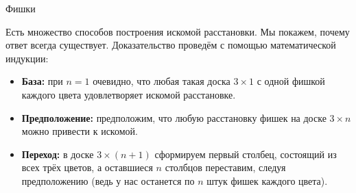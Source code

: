 \begin{tutorial}{Фишки}

Есть множество способов построения искомой расстановки. Мы покажем, почему ответ всегда существует. Доказательство проведём с помощью математической индукции:
\begin{itemize}
\item \textbf{База:} при $n=1$ очевидно, что любая такая доска $3\times1$ с одной фишкой каждого цвета удовлетворяет искомой расстановке.
\item \textbf{Предположение:} предположим, что любую расстановку фишек на доске $3\times n$ можно привести к искомой.
\item \textbf{Переход:} в доске $3\times (n + 1)$ сформируем первый столбец, состоящий из всех трёх цветов, а оставшиеся $n$ столбцов переставим, следуя предположению (ведь у нас останется по $n$ штук фишек каждого цвета).
\end{itemize}

\end{tutorial}
